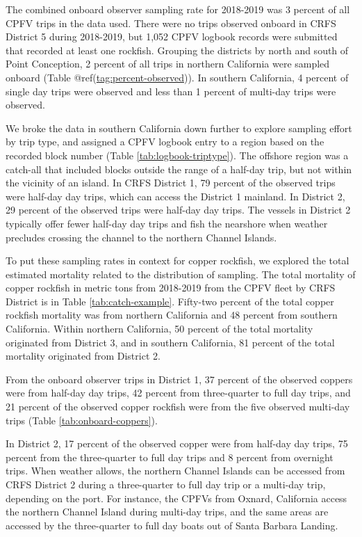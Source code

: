 \documentclass[11pt,
  english,
  letterpaper,
]{article}
\begin{document}
The combined onboard observer sampling rate for 2018-2019 was 3 percent of all CPFV trips in the data used. There were no trips observed onboard in CRFS District 5 during 2018-2019, but 1,052 CPFV logbook records were submitted that recorded at least one rockfish. Grouping the districts by north and south of Point Conception, 2 percent of all trips in northern California were sampled onboard (Table @ref(\url{tag:percent-observed})). In southern California, 4 percent of single day trips were observed and less than 1 percent of multi-day trips were observed.

We broke the data in southern California down further to explore sampling effort by trip type, and assigned a CPFV logbook entry to a region based on the recorded block number (Table \ref{tab:logbook-triptype}). The offshore region was a catch-all that included blocks outside the range of a half-day trip, but not within the vicinity of an island. In CRFS District 1, 79 percent of the observed trips were half-day day trips, which can access the District 1 mainland. In District 2, 29 percent of the observed trips were half-day day trips. The vessels in District 2 typically offer fewer half-day day trips and fish the nearshore when weather precludes crossing the channel to the northern Channel Islands.

To put these sampling rates in context for copper rockfish, we explored the total estimated mortality related to the distribution of sampling. The total mortality of copper rockfish in metric tons from 2018-2019 from the CPFV fleet by CRFS District is in Table \ref{tab:catch-example}. Fifty-two percent of the total copper rockfish mortality was from northern California and 48 percent from southern California. Within northern California, 50 percent of the total mortality originated from District 3, and in southern California, 81 percent of the total mortality originated from District 2.

From the onboard observer trips in District 1, 37 percent of the observed coppers were from half-day day trips, 42 percent from three-quarter to full day trips, and 21 percent of the observed copper rockfish were from the five observed multi-day trips (Table \ref{tab:onboard-coppers}).

In District 2, 17 percent of the observed copper were from half-day day trips, 75 percent from the three-quarter to full day trips and 8 percent from overnight trips. When weather allows, the northern Channel Islands can be accessed from CRFS District 2 during a three-quarter to full day trip or a multi-day trip, depending on the port. For instance, the CPFVs from Oxnard, California access the northern Channel Island during multi-day trips, and the same areas are accessed by the three-quarter to full day boats out of Santa Barbara Landing.
\end{document}

